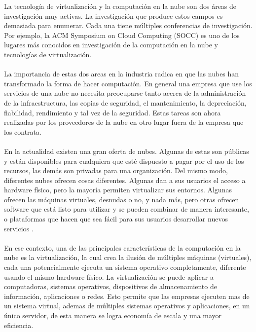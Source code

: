 \documentclass[conference, spanish]{IEEEtran}
\begin{document}
La tecnología de virtualización y la computación en la nube son dos áreas de investigación muy activas. La investigación que produce estos campos es demasiada para enumerar. Cada una tiene múltiples conferencias de investigación. Por ejemplo, la ACM Symposium on Cloud Computing (SOCC) \cite{socc15} es uno de los lugares más conocidos en investigación de la computación en la nube y tecnologías de virtualización.\\
\\
La importancia de estas dos areas en la industria radica en que las nubes han transformado la forma de hacer computación. En general una empresa que use los servicios de una nube no necesita preocuparse tanto acerca de la administración de la infraestructura, las copias de seguridad, el mantenimiento, la depreciación, fiabilidad, rendimiento y tal vez de la seguridad. Estas tareas son ahora realizadas por los proveedores de la nube en otro lugar fuera de la empresa que los contrata.\\
\\
En la actualidad existen una gran oferta de nubes. Algunas de estas son públicas y están disponibles para cualquiera que esté dispuesto a pagar por el uso de los recursos, las demás son privadas para una organización. Del mismo modo, diferentes nubes ofrecen cosas diferentes. Algunas dan a sus usuarios el acceso a hardware físico, pero la mayoría permiten virtualizar sus entornos. Algunas ofrecen  las máquinas virtuales, desnudas o no, y nada más, pero otras ofrecen software que está listo para
utilizar y se pueden combinar de manera interesante, o plataformas que hacen que sea fácil para
sus usuarios desarrollar nuevos servicios \cite{tanembaum14}.\\
\\
En ese contexto, una de las principales características de la computación en la nube es la virtualización, la cual crea la ilusión de múltiples máquinas (virtuales), cada una potencialmente ejecuta un sistema operativo completamente, diferente usando el mismo hardware físico. La virtualización se puede aplicar a computadoras, sistemas operativos, dispositivos de almacenamiento de información, aplicaciones o redes. Esto permite que las empresas ejecuten mas de un sistema virtual, ademas de múltiples sistemas operativos y aplicaciones, en un único servidor, de esta manera se logra economía de escala y una mayor eficiencia.\\
\\
\end{document}
